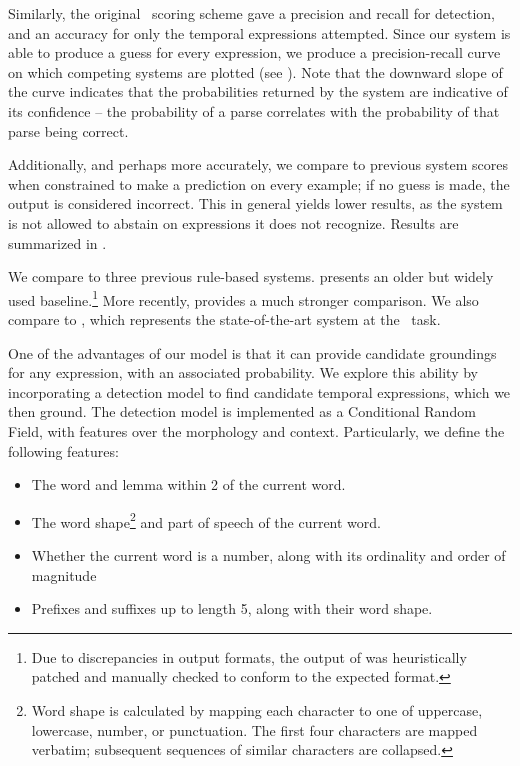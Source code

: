 
Similarly, the original \tempeval\ scoring scheme gave a precision 
	and recall for detection, and an accuracy for only the temporal expressions 
	attempted.
Since our system is able to produce a guess for every expression, we produce
	a precision-recall curve on which competing systems are plotted
	(see ).
Note that the downward slope of the curve indicates that the probabilities
	returned by the system are indicative of its confidence -- the probability
	of a parse correlates with the probability of that parse being correct.

Additionally, and perhaps more accurately, we compare to 
	previous system scores when constrained to make a prediction on every
	example; if no guess is made, the output is considered incorrect.
This in general yields lower results, as the system is not allowed to
	abstain on expressions it does not recognize.
Results are summarized in .

We compare to three previous rule-based systems.
 \cite{key:2000mani-temporal} presents an older but widely
	used baseline.\footnote{
		Due to discrepancies in output formats, 
			the output of  was heuristically patched
			and manually checked to conform to the expected format.
	}
More recently,  \cite{key:2012chang-temporal} 
	provides a much stronger comparison.
We also compare to  \cite{key:2010strotgen-temporal}, 
	which represents the state-of-the-art system at the \tempeval\ task.

One of the advantages of our model is that it can provide candidate groundings for any
	expression, with an associated probability.
We explore this ability by incorporating a detection model to find candidate temporal
	expressions, which we then ground.
The detection model is implemented as a Conditional Random Field, with features over the
	morphology and context.
Particularly, we define the following features:
\begin{itemize}
\item The word and lemma within 2 of the current word.
\item The word shape\footnote{
		Word shape is calculated by mapping each character to one of uppercase, lowercase, number,
			or punctuation.
		The first four characters are mapped verbatim; subsequent sequences of similar characters
			are collapsed.
	}
	and part of speech of the current word.
\item Whether the current word is a number, along with its ordinality and order of magnitude
\item Prefixes and suffixes up to length 5, along with their word shape.
\end{itemize}


